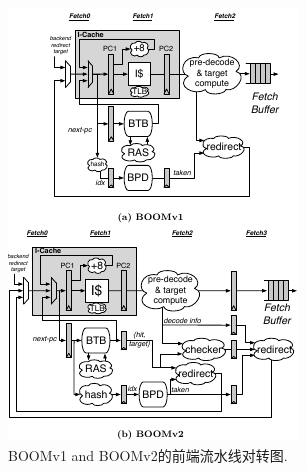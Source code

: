 \documentclass{article}
\begin{document}
\begin{multicols}{2}
\begin{itemize}
\begin{enumerate}
\begin{figure}[H]
			\includegraphics[width=\linewidth]{figs/BOOMbranch.png}
			\captionsetup{labelformat=empty}
			\caption{\small{BOOMv1 and BOOMv2的前端流水线对转图.~\cite{Celio:EECS-2017-157}}}	
			\end{figure}
			

\end{enumerate}
\end{itemize}
\end{multicols}
\end{document}
